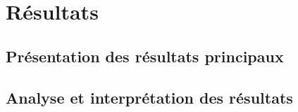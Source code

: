 \documentclass[xcolor={table,usenames,dvipsnames}]{beamer}
\let\olditem\item
\renewcommand{\item}{%
\olditem\vspace{0pt}}
\newcommand{\bolder}[1]{{\color{purple}\bfseries#1}}
\begin{document}
\section{Résultats}
\subsection[Présentation des résultats principaux]{Présentation des résultats principaux}

\subsection[Analyse et interprétation des résultats]{Analyse et interprétation des résultats}





%	
	




\end{document}

